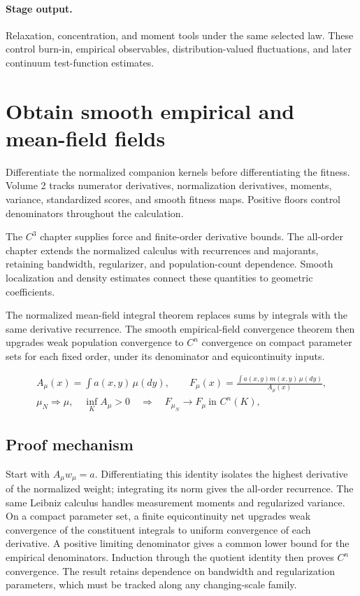 \documentclass[11pt,a4paper]{article}
\begin{document}
\paragraph{Stage output.} Relaxation, concentration, and moment tools under the same selected law. These control burn-in, empirical observables, distribution-valued fluctuations, and later continuum test-function estimates.

\section{Obtain smooth empirical and mean-field fields}
\label{stage:9}
Differentiate the normalized companion kernels before differentiating the fitness. Volume 2 tracks numerator derivatives, normalization derivatives, moments, variance, standardized scores, and smooth fitness maps. Positive floors control denominators throughout the calculation.

The \(C^3\) chapter supplies force and finite-order derivative bounds. The all-order chapter extends the normalized calculus with recurrences and majorants, retaining bandwidth, regularizer, and population-count dependence. Smooth localization and density estimates connect these quantities to geometric coefficients.

The normalized mean-field integral theorem replaces sums by integrals with the same derivative recurrence. The smooth empirical-field convergence theorem then upgrades weak population convergence to \(C^n\) convergence on compact parameter sets for each fixed order, under its denominator and equicontinuity inputs.


\begin{gather*}
A_\mu(x)=\int a(x,y)\,\mu(dy),\qquad
F_\mu(x)=\frac{\int a(x,y)m(x,y)\,\mu(dy)}{A_\mu(x)},\\
\mu_N\Rightarrow\mu,\quad \inf_K A_\mu>0
\quad\Longrightarrow\quad F_{\mu_N}\longrightarrow F_\mu\ \text{in }C^n(K),
\end{gather*}
\subsection*{Proof mechanism}
Start with \(A_\mu w_\mu=a\). Differentiating this identity isolates the highest derivative of the normalized weight; integrating its norm gives the all-order recurrence. The same Leibniz calculus handles measurement moments and regularized variance. On a compact parameter set, a finite equicontinuity net upgrades weak convergence of the constituent integrals to uniform convergence of each derivative. A positive limiting denominator gives a common lower bound for the empirical denominators. Induction through the quotient identity then proves \(C^n\) convergence. The result retains dependence on bandwidth and regularization parameters, which must be tracked along any changing-scale family.
\end{document}

